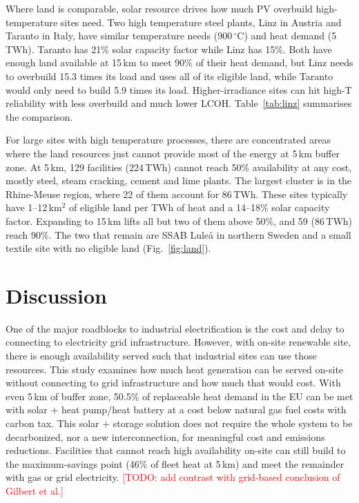 \documentclass[11pt]{article}
\newcommand{\todo}[1]{\textcolor{red}{[TODO: #1]}}
\begin{document}
Where land is comparable, solar resource drives how much PV overbuild high-temperature sites need. Two high temperature steel plants, Linz in Austria and Taranto in Italy, have similar temperature needs (900\,$^\circ$C) and heat demand (5\,TWh). Taranto has 21\% solar capacity factor while Linz has 15\%. Both have enough land available at 15\,km to meet 90\% of their heat demand, but Linz needs to overbuild 15.3 times its load and uses all of its eligible land, while Taranto would only need to build 5.9 times its load. Higher-irradiance sites can hit high-T reliability with less overbuild and much lower LCOH. Table~\ref{tab:linz} summarises the comparison.

For large sites with high temperature processes, there are concentrated areas where the land resources just cannot provide most of the energy at 5\,km buffer zone. At 5\,km, 129 facilities (224\,TWh) cannot reach 50\% availability at any cost, mostly steel, steam cracking, cement and lime plants. The largest cluster is in the Rhine-Meuse region, where 22 of them account for 86\,TWh. These sites typically have 1--12\,km$^2$ of eligible land per TWh of heat and a 14--18\% solar capacity factor. Expanding to 15\,km lifts all but two of them above 50\%, and 59 (86\,TWh) reach 90\%. The two that remain are SSAB Lule\aa{} in northern Sweden and a small textile site with no eligible land (Fig.~\ref{fig:land}).

\section*{Discussion}
One of the major roadblocks to industrial electrification is the cost and delay to connecting to electricity grid infrastructure. However, with on-site renewable site, there is enough availability served such that industrial sites can use those resources. This study examines how much heat generation can be served on-site without connecting to grid infrastructure and how much that would cost. With even 5\,km of buffer zone, 50.5\% of replaceable heat demand in the EU can be met with solar + heat pump/heat battery at a cost below natural gas fuel costs with carbon tax. This solar + storage solution does not require the whole system to be decarbonized, nor a new interconnection, for meaningful cost and emissions reductions. Facilities that cannot reach high availability on-site can still build to the maximum-savings point (46\% of fleet heat at 5\,km) and meet the remainder with gas or grid electricity.
\todo{add contrast with grid-based conclusion of Gilbert et al.\cite{gilbert2023lcoh}}
\end{document}
